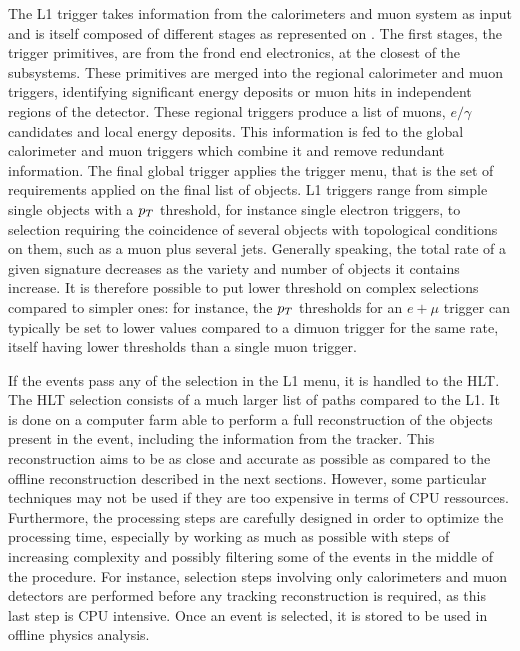         The L1 trigger takes information from the calorimeters and muon system as input
        and is itself composed of different stages as
        represented on . The first stages, the trigger primitives,
        are from the frond end electronics, at the closest of the subsystems.
        These primitives are merged into the regional calorimeter and muon triggers,
        identifying significant energy deposits or muon hits in independent regions of the
        detector. These regional triggers produce a list of muons, $e/\gamma$ candidates
        and local energy deposits. This information is fed to the global calorimeter and
        muon triggers which combine it and remove redundant information. The final global trigger applies
        the trigger menu, that is the set of requirements applied on the final list of
        objects. L1 triggers range from simple single objects with a $p_T$ threshold,
        for instance single electron triggers, to
        selection requiring the coincidence of several objects with topological conditions
        on them, such as a muon plus several jets. Generally speaking, the total rate of
        a given signature decreases as the variety and number of objects it contains increase.
        It is therefore possible to put lower threshold on complex selections compared to
        simpler ones: for instance, the $p_T$ thresholds for an $e+\mu$ trigger can typically
        be set to lower values compared to a dimuon trigger for the same rate, itself having
        lower thresholds than a single muon trigger.

        If the events pass any of the selection in the L1 menu, it is handled to the HLT.
        The HLT selection consists of a much larger list of paths compared to the L1.
        It is done on a computer farm able to perform a full reconstruction
        of the objects present in the event, including the information from the tracker.
        This reconstruction aims to be as close and accurate as possible as compared to the
        offline reconstruction described in the next sections.
        However, some particular techniques may not be used if they are too expensive in
        terms of CPU ressources. Furthermore, the processing steps are carefully designed in order to
        optimize the processing time, especially by working as much as possible with steps
        of increasing complexity and possibly filtering some of the events in the middle
        of the procedure. For instance, selection steps involving only calorimeters and
        muon detectors are performed before any tracking reconstruction is required, as this
        last step is CPU intensive. Once an event is selected, it is stored to be used in
        offline physics analysis.


